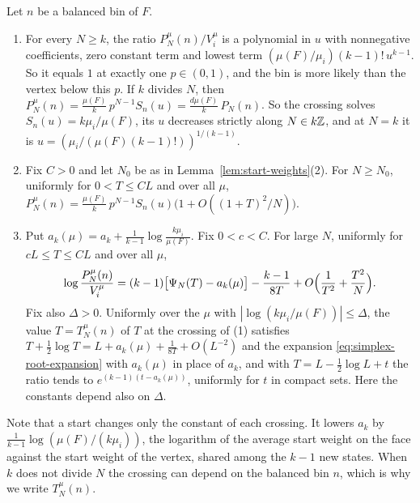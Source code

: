 \begin{theorem}\label{thm:start-crossings}
Let $n$ be a balanced bin of $F$.
\begin{enumerate}[(1)]
\item For every $N\ge k$, the ratio $P^\mu_N(n)/V^\mu_i$ is a polynomial in $u$
with nonnegative coefficients, zero constant term and lowest term
$(\mu(F)/\mu_i)(k-1)!\,u^{k-1}$. So it equals $1$ at exactly one $p\in(0,1)$, and
the bin is more likely than the vertex below this $p$. If $k$ divides $N$, then
$P^\mu_N(n)=\frac{\mu(F)}k\,p^{N-1}S_n(u)=\frac{d\mu(F)}k\,P_N(n)$.
So the crossing solves $S_n(u)=k\mu_i/\mu(F)$, its $u$ decreases strictly along
$N\in k\mathbb Z$, and at $N=k$ it is $u=(\mu_i/(\mu(F)(k-1)!))^{1/(k-1)}$.
\item Fix $C>0$ and let $N_0$ be as in Lemma~\ref{lem:start-weights}(2). For
$N\ge N_0$, uniformly for $0<T\le CL$ and over all $\mu$,
$P^\mu_N(n)=\frac{\mu(F)}k\,p^{N-1}S_n(u)\bigl(1+O((1+T)^2/N)\bigr)$.
\item Put $a_k(\mu)=a_k+\frac1{k-1}\log\frac{k\mu_i}{\mu(F)}$. Fix $0<c<C$. For
large $N$, uniformly for $cL\le T\le CL$ and over all $\mu$,
\[
 \log\frac{P^\mu_N(n)}{V^\mu_i}=(k-1)\bigl[\Psi_N(T)-a_k(\mu)\bigr]
 -\frac{k-1}{8T}+O\Bigl(\frac1{T^2}+\frac{T^2}N\Bigr).
\]
Fix also $\Delta>0$. Uniformly over the $\mu$ with $|\log(k\mu_i/\mu(F))|\le\Delta$, the
value $T=T^\mu_N(n)$ of $T$ at the crossing of (1) satisfies
$T+\frac12\log T=L+a_k(\mu)+\frac1{8T}+O(L^{-2})$ and the expansion
\eqref{eq:simplex-root-expansion} with $a_k(\mu)$ in place of $a_k$, and with
$T=L-\frac12\log L+t$ the ratio tends to $e^{(k-1)(t-a_k(\mu))}$, uniformly for
$t$ in compact sets. Here the constants depend also on $\Delta$.
\end{enumerate}
\end{theorem}

Note that a start changes only the constant of each crossing. It lowers $a_k$
by $\frac1{k-1}\log(\mu(F)/(k\mu_i))$, the logarithm of the average start
weight on the face against the start weight of the vertex, shared among the
$k-1$ new states. When $k$ does not divide $N$ the crossing can depend on the
balanced bin $n$, which is why we write $T^\mu_N(n)$.

